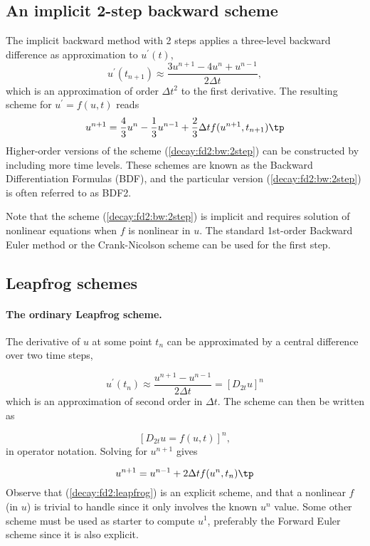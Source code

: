 \documentclass[graybox,sectrefs,envcountresetchap,open=right,final]{svmonodo}
\begin{document}
\subsection{An implicit 2-step backward scheme}

 

The implicit backward method with 2 steps applies a
three-level backward difference as approximation to $u^{\prime}(t)$,
\[ u^{\prime}(t_{n+1}) \approx \frac{3u^{n+1} - 4u^{n} + u^{n-1}}{2\Delta t},\]
which is an approximation of order $\Delta t^2$ to the first derivative.
The resulting scheme for $u^{\prime}=f(u,t)$ reads
\begin{equation}
u^{n+1} = \frac{4}{3}u^n - \frac{1}{3}u^{n-1} +
\frac{2}{3}\Delta t f(u^{n+1}, t_{n+1})
\tp
\label{decay:fd2:bw:2step}
\end{equation}
Higher-order versions of the scheme (\ref{decay:fd2:bw:2step}) can
be constructed by including more time levels. These schemes are known
as the Backward Differentiation Formulas (BDF), and the particular
version (\ref{decay:fd2:bw:2step}) is often referred to as BDF2.

Note that the scheme (\ref{decay:fd2:bw:2step}) is implicit and requires
solution of nonlinear equations when $f$ is nonlinear in $u$.  The
standard 1st-order Backward Euler method or the Crank-Nicolson scheme
can be used for the first step.


\subsection{Leapfrog schemes}


\paragraph{The ordinary Leapfrog scheme.}
The derivative of $u$ at some point $t_n$ can be approximated by
a central difference over two time steps,

\begin{equation}
u^{\prime}(t_n)\approx \frac{u^{n+1}-u^{n-1}}{2\Delta t} = [D_{2t}u]^n
\end{equation}
which is an approximation of second order in $\Delta t$. The scheme
can then be written as

\[ [D_{2t}u=f(u,t)]^n, \]
in operator notation. Solving for $u^{n+1}$ gives

\begin{equation}
u^{n+1} = u^{n-1} + 2\Delta t f(u^n, t_n)
\tp
\label{decay:fd2:leapfrog}
\end{equation}
Observe that (\ref{decay:fd2:leapfrog}) is an explicit scheme, and that
a nonlinear $f$ (in $u$) is trivial to handle since it only involves
the known $u^n$ value.
Some other scheme must be used as starter to compute $u^1$, preferably
the Forward Euler scheme since it is also explicit.
\end{document}
